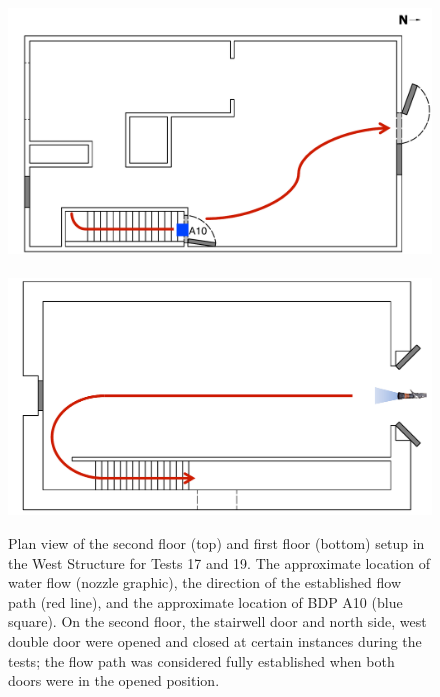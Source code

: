 \documentclass[12pt,oneside]{book}
\begin{document}
\begin{figure}[!ht]
	\includegraphics[width=\columnwidth]{../Figures/Floor_Plans/Specific_Tests/West_Hose_Test_2nd_Floor_Annotated}
	\\~\\
	\includegraphics[width=\columnwidth]{../Figures/Floor_Plans/Specific_Tests/West_Hose_Test_19_1st_Floor_Annotated}
	\caption[Plan view of the West Structure setup for Tests 17 and 19.]{Plan view of the second floor (top) and first floor (bottom) setup in the West Structure for Tests 17 and 19. The approximate location of water flow (nozzle graphic), the direction of the established flow path (red line), and the approximate location of BDP A10 (blue square). On the second floor, the stairwell door and north side, west double door were opened and closed at certain instances during the tests; the flow path was considered fully established when both doors were in the opened position.}
	\label{fig:flow_path_2}
\end{figure}
\FloatBarrier
\end{document}
